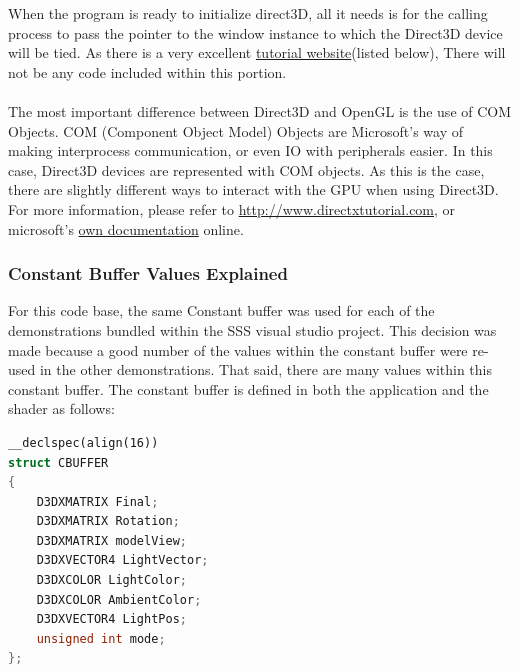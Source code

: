 \documentclass[a4paper, 12pt]{article}
\begin{document}
When the program is ready to initialize direct3D, all it needs is for the
calling process to pass the pointer to the window instance to which the
Direct3D device will be tied. As there is a very excellent
\href{http://www.directxtutorial.com}{tutorial website}(listed below), There
will not be any code included within this portion. \\ \\ The most important
difference between Direct3D and OpenGL is the use of COM Objects. COM
(Component Object Model) Objects are Microsoft's way of making interprocess
communication, or even IO with peripherals easier. In this case, Direct3D
devices are represented with COM objects. As this is the case, there are
slightly different ways to interact with the GPU when using Direct3D. For more
information, please refer to
\href{http://www.directxtutorial.com}{http://www.directxtutorial.com}, or
microsoft's \href{https://msdn.microsoft.com/en-
us/library/windows/desktop/ms690343(v=vs.85).aspx}{own documentation} online.

\subsubsection{Constant Buffer Values Explained}

For this code base, the same Constant buffer was used for each of the
demonstrations bundled within the SSS visual studio project. This decision was
made because a good number of the values within the constant buffer were re-
used in the other demonstrations. That said, there are many values within this
constant buffer. The constant buffer is defined in both the application and
the shader as follows:

\begin{lstlisting}[language=C++, numbers=none, frame=none]
__declspec(align(16))
struct CBUFFER
{
	D3DXMATRIX Final;
	D3DXMATRIX Rotation;
	D3DXMATRIX modelView;
	D3DXVECTOR4 LightVector;
	D3DXCOLOR LightColor;
	D3DXCOLOR AmbientColor;
	D3DXVECTOR4 LightPos;
	unsigned int mode;
};
\end{lstlisting}
\end{document}

